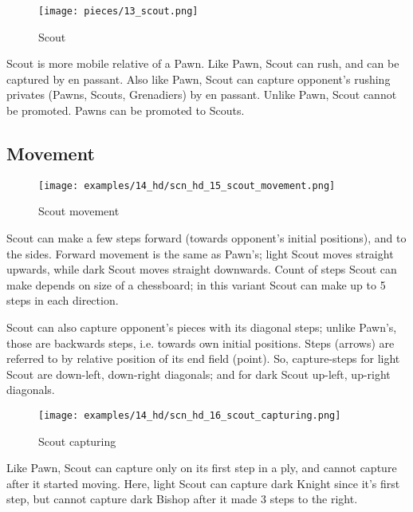 \vspace*{-0.7\baselineskip}
\noindent
\begin{wrapfigure}[9]{l}{0.4\textwidth}
\centering
\texttt{[image: pieces/13\_scout.png]}
\vspace*{-1.3\baselineskip}
\caption{Scout}
\label{fig:13_scout}
\end{wrapfigure}
Scout is more mobile relative of a Pawn. Like Pawn, Scout can rush, and can be captured
by en passant. Also like Pawn, Scout can capture opponent's rushing privates (Pawns,
Scouts, Grenadiers) by en passant. Unlike Pawn, Scout cannot be promoted. Pawns can be
promoted to Scouts.

\vspace*{0.7\baselineskip}
\subsection*{Movement}
\label{sec:Hemera's Dawn/Scout/Movement}

\vspace*{-1.3\baselineskip}
\noindent
\begin{figure}[!h]
\texttt{[image: examples/14\_hd/scn\_hd\_15\_scout\_movement.png]}
\vspace*{-1.3\baselineskip}
\caption{Scout movement}
\label{fig:scn_hd_15_scout_movement}
\end{figure}

\vspace*{-0.5\baselineskip}
Scout can make a few steps forward (towards opponent's initial positions), and
to the sides. Forward movement is the same as Pawn's; light Scout moves straight
upwards, while dark Scout moves straight downwards. Count of steps Scout can make
depends on size of a chessboard; in this variant Scout can make up to 5 steps in
each direction.

\clearpage %

Scout can also capture opponent's pieces with its diagonal steps; unlike Pawn's,
those are backwards steps, i.e. towards own initial positions. \newline
\indent
Steps (arrows) are referred to by relative position of its end field (point).
So, capture-steps for light Scout are down-left, down-right diagonals;
and for dark Scout up-left, up-right diagonals.

\vspace*{-0.3\baselineskip}
\noindent
\begin{wrapfigure}[7]{l}{0.41\textwidth}
\centering
\texttt{[image: examples/14\_hd/scn\_hd\_16\_scout\_capturing.png]}
\vspace*{-0.3\baselineskip}
\caption{Scout capturing}
\label{fig:scn_hd_16_scout_capturing}
\end{wrapfigure}
Like Pawn, Scout can capture only on its first step in a ply, and cannot capture
after it started moving. Here, light Scout can capture dark Knight since it's
first step, but cannot capture dark Bishop after it made 3 steps to the right.

